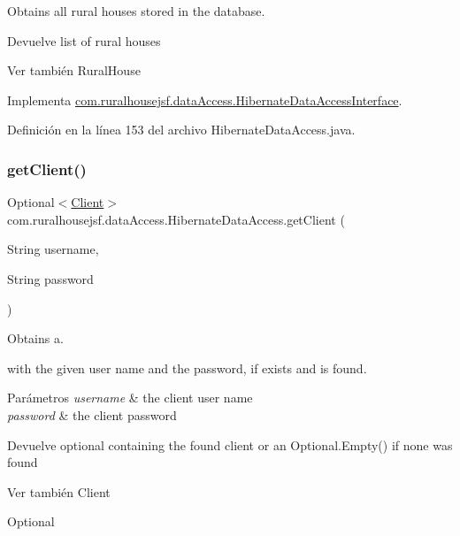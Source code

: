 Obtains all rural houses stored in the database. 

\begin{DoxyReturn}{Devuelve}
list of rural houses
\end{DoxyReturn}
\begin{DoxySeeAlso}{Ver también}
Rural\+House 
\end{DoxySeeAlso}


Implementa \mbox{\hyperlink{interfacecom_1_1ruralhousejsf_1_1data_access_1_1_hibernate_data_access_interface_a1cdfce6d8d91e481887b364000fbf6d0}{com.\+ruralhousejsf.\+data\+Access.\+Hibernate\+Data\+Access\+Interface}}.



Definición en la línea 153 del archivo Hibernate\+Data\+Access.\+java.

\mbox{\label{classcom_1_1ruralhousejsf_1_1data_access_1_1_hibernate_data_access_a6df6a0502595b73be0f6d238743eeda5}} 
\subsubsection{\texorpdfstring{getClient()}{getClient()}}
{\footnotesize\ttfamily Optional$<$\mbox{\hyperlink{classcom_1_1ruralhousejsf_1_1domain_1_1_client}{Client}}$>$ com.\+ruralhousejsf.\+data\+Access.\+Hibernate\+Data\+Access.\+get\+Client (\begin{DoxyParamCaption}\item[{String}]{username,  }\item[{String}]{password }\end{DoxyParamCaption})}



Obtains a. 


\begin{DoxyCode}{0}
\end{DoxyCode}
 with the given user name and the password, if exists and is found.


\begin{DoxyParams}{Parámetros}
{\em username} & the client user name \\
\hline
{\em password} & the client password\\
\hline
\end{DoxyParams}
\begin{DoxyReturn}{Devuelve}
optional containing the found client or an {\ttfamily Optional.\+Empty()} if none was found
\end{DoxyReturn}
\begin{DoxySeeAlso}{Ver también}
Client 

Optional 
\end{DoxySeeAlso}


